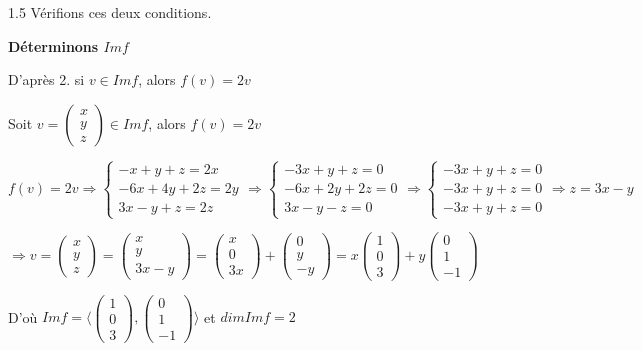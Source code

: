 \documentclass[12pt]{article}
\begin{document}
\begin{spacing}{1.5}
Vérifions ces deux conditions.

\medskip
\textbf{Déterminons $Imf$}

D'après 2. si $v\in Imf$, alors $f(v)=2v$

Soit $v=\begin{pmatrix}
x\\
y\\
z
\end{pmatrix}\in Imf$, alors $f(v)=2v$

$f(v)=2v \Rightarrow \begin{cases}
-x+y+z=2x\\
-6x+4y+2z=2y\\
3x-y+z=2z
\end{cases}\Rightarrow \begin{cases}
-3x+y+z=0\\
-6x+2y+2z=0\\
3x-y-z=0
\end{cases}\Rightarrow \begin{cases}
-3x+y+z=0\\
-3x+y+z=0\\
-3x+y+z=0
\end{cases}\Rightarrow z=3x-y$

$\Rightarrow v=\begin{pmatrix}
x\\
y\\
z
\end{pmatrix}=\begin{pmatrix}
x\\
y\\
3x-y
\end{pmatrix}=\begin{pmatrix}
x\\
0\\
3x
\end{pmatrix}+\begin{pmatrix}
0\\
y\\
-y
\end{pmatrix}=x\begin{pmatrix}
1\\
0\\
3
\end{pmatrix}+y\begin{pmatrix}
0\\
1\\
-1
\end{pmatrix}$

D'où $Imf=\langle \begin{pmatrix}
1\\
0\\
3
\end{pmatrix},\begin{pmatrix}
0 \\
1 \\
-1
\end{pmatrix}\rangle$ et $dimImf=2$


\end{spacing}
\end{document}
